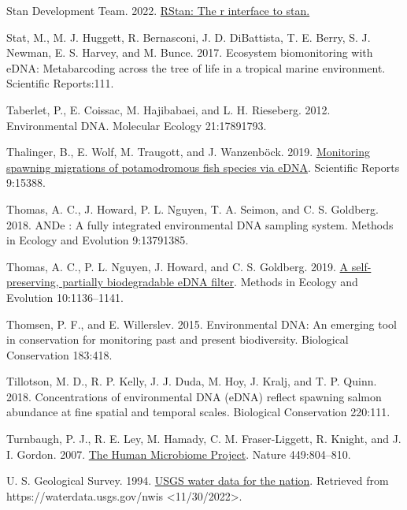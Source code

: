 \documentclass[
]{article}
\newlength{\cslhangindent}
\newlength{\cslentryspacingunit} %
\newenvironment{CSLReferences}[2] %
 {%
  \setlength{\parindent}{0pt}
  \ifodd #1
  \let\oldpar\par
  \def\par{\hangindent=\cslhangindent\oldpar}
  \fi
  \setlength{\parskip}{#2\cslentryspacingunit}
 }%
 {}
\begin{document}
\begin{CSLReferences}{1}{0}
\leavevmode{}%
Stan Development Team. 2022. \href{https://mc-stan.org/}{RStan: The r
interface to stan.}

\leavevmode{}%
Stat, M., M. J. Huggett, R. Bernasconi, J. D. DiBattista, T. E. Berry,
S. J. Newman, E. S. Harvey, and M. Bunce. 2017. Ecosystem biomonitoring
with eDNA: Metabarcoding across the tree of life in a tropical marine
environment. Scientific Reports:111.

\leavevmode{}%
Taberlet, P., E. Coissac, M. Hajibabaei, and L. H. Rieseberg. 2012.
Environmental DNA. Molecular Ecology 21:17891793.

\leavevmode{}%
Thalinger, B., E. Wolf, M. Traugott, and J. Wanzenböck. 2019.
\href{https://doi.org/10.1038/s41598-019-51398-0}{Monitoring spawning
migrations of potamodromous fish species via eDNA}. Scientific Reports
9:15388.

\leavevmode{}%
Thomas, A. C., J. Howard, P. L. Nguyen, T. A. Seimon, and C. S.
Goldberg. 2018. ANDe {\texttrademark}: A fully integrated environmental
DNA sampling system. Methods in Ecology and Evolution 9:13791385.

\leavevmode{}%
Thomas, A. C., P. L. Nguyen, J. Howard, and C. S. Goldberg. 2019.
\href{https://doi.org/10.1111/2041-210X.13212}{A self-preserving,
partially biodegradable eDNA filter}. Methods in Ecology and Evolution
10:1136--1141.

\leavevmode{}%
Thomsen, P. F., and E. Willerslev. 2015. Environmental DNA: An emerging
tool in conservation for monitoring past and present biodiversity.
Biological Conservation 183:418.

\leavevmode{}%
Tillotson, M. D., R. P. Kelly, J. J. Duda, M. Hoy, J. Kralj, and T. P.
Quinn. 2018. Concentrations of environmental DNA (eDNA) reflect spawning
salmon abundance at fine spatial and temporal scales. Biological
Conservation 220:111.

\leavevmode{}%
Turnbaugh, P. J., R. E. Ley, M. Hamady, C. M. Fraser-Liggett, R. Knight,
and J. I. Gordon. 2007. \href{https://doi.org/10.1038/nature06244}{The
Human Microbiome Project}. Nature 449:804--810.

\leavevmode{}%
U. S. Geological Survey. 1994.
\href{https://doi.org/10.5066/F7P55KJN}{USGS water data for the nation}.
Retrieved from https://waterdata.usgs.gov/nwis
\textless11/30/2022\textgreater.


\end{CSLReferences}
\end{document}
